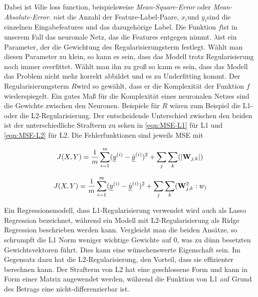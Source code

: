 Dabei ist \(V\)die loss function, beispielsweise \textit{Mean-Square-Error} oder \textit{Mean-Absolute-Error}.
\(n\)ist die Anzahl der Feature-Label-Paare,
\(x_i\)und \(y_i\)sind die einzelnen Eingabefeatures und das dazugehörige Label.
Die Funktion \(f\)ist in unserem Fall das neuronale Netz, das die Features entgegen nimmt.
\(\lambda\)ist ein Parameter, der die Gewichtung des Regularisierungsterm festlegt.
Wählt man diesen Parameter zu klein, so kann es sein, dass das Modell trotz Regularisierung noch immer overfittet.
Wählt man ihn zu groß so kann es sein, dass das Modell das Problem nicht mehr korrekt abbildet und es zu Underfitting kommt.
Der Regularisierungsterm \(R\)wird so gewählt, dass er die Komplexität der Funktion \(f\)wiederspiegelt.
Ein gutes Maß für die Komplexität eines neuronalen Netzes sind die Gewichte zwischen den Neuronen.
Beispiele für \(R\) wären zum Beispiel die L1- oder die L2-Regularisierung. %
Der entscheidende Unterschied zwischen den beiden ist der unterschiedliche Strafterm zu sehen in \ref{eqn:MSE-L1} für L1 und \ref{eqn:MSE-L2} für L2. 
Die Fehlerfunktionen sind jeweils MSE mit 

\begin{equation} \label{eqn:MSE-L1}
	J(X, Y) = \frac{1}{m} \sum_{i=1}^{m} ({\underline{y}}^{(i)} - \hat{{\underline{y}}}^{(i)})^2 + \sum_{j} \sum_{k} (|{{\mathbf{W}}}_{j,k}|)
\end{equation} 

\begin{equation} \label{eqn:MSE-L2}
	J(X, Y) = \frac{1}{m} \sum_{i=1}^{m} ({\underline{y}}^{(i)} - \hat{{\underline{y}}}^{(i)})^2 + \sum_{j} \sum_{k} ({{\mathbf{W}}}_{j,k}^2:w_)
\end{equation} 


Ein Regressionsmodell, dass L1-Regularisierung verwendet wird auch als Lasso Regression bezeichnet, 
während ein Modell mit L2-Regularisierung als Ridge Regression beschrieben werden kann.
Vergleicht man die beiden Ansätze, so schrumpft die L1 Norm weniger wichtige Gewichte auf 0, was zu dünn besetzten Gewichtsvektoren führt.
Dies kann eine wünschenswerte Eigenschaft sein.
Im Gegensatz dazu hat die L2-Regularisierung, den Vorteil, dass sie effizienter berechnen kann.
Der Strafterm von L2 hat eine geschlossene Form und kann in Form einer Matrix angewendet werden, während die Funktion von L1 auf Grund des Betrags eine nicht-differenzierbar ist.





